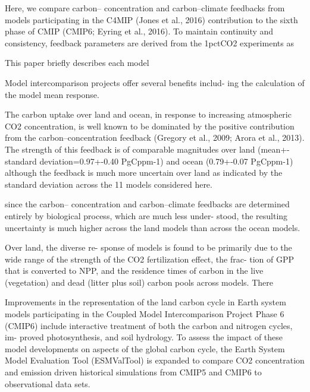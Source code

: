 \documentclass{article}
\begin{document}

\citet{Arora2020}
Here, we compare carbon– concentration and carbon–climate feedbacks from models participating in the C4MIP (Jones et al., 2016) contribution to the sixth phase of CMIP (CMIP6; Eyring et al., 2016). To maintain continuity and consistency, feedback parameters are derived from the 1pctCO2 experiments as

This paper briefly describes each model 

Model intercomparison projects offer several benefits includ- ing the calculation of the model mean response. 

The carbon uptake over land and ocean, in response to increasing atmospheric CO2 concentration, is well known to be dominated by the positive contribution from the carbon–concentration feedback (Gregory et al., 2009; Arora et al., 2013). The strength of this feedback is of comparable magnitudes over land (mean+-standard deviation=0.97+-0.40 PgCppm-1) and ocean (0.79+-0.07 PgCppm-1) although the feedback is much more uncertain over land as indicated by the standard deviation across the 11 models considered here. 

since the carbon– concentration and carbon–climate feedbacks are determined entirely by biological process, which are much less under- stood, the resulting uncertainty is much higher across the land models than across the ocean models.

Over land, the diverse re- sponse of models is found to be primarily due to the wide range of the strength of the CO2 fertilization effect, the frac- tion of GPP that is converted to NPP, and the residence times of carbon in the live (vegetation) and dead (litter plus soil) carbon pools across models. There

\citet{Gier2024}
Improvements in the representation of the land carbon cycle in Earth system models participating in the Coupled Model Intercomparison Project Phase 6 (CMIP6) include interactive treatment of both the carbon and nitrogen cycles, im- proved photosynthesis, and soil hydrology.  To assess the impact of these model developments on aspects of the global carbon cycle, the Earth System Model Evaluation Tool (ESMValTool) is expanded to compare CO2 concentration and emission driven historical simulations from CMIP5 and CMIP6 to observational data sets.
\end{document}
